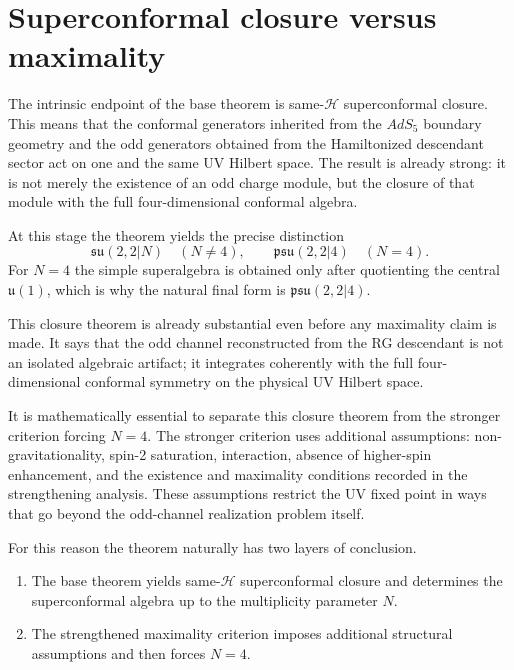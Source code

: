 \documentclass[
  aps,
  prd,
  onecolumn,
  notitlepage,
  nofootinbib,
  superscriptaddress,
  10pt
]{revtex4-2}
\theoremstyle{definition}
\theoremstyle{plain}
\begin{document}
\section{Superconformal closure versus maximality}
\label{sec:UV-fixed-point}

The intrinsic endpoint of the base theorem is same-\(\mathcal H\)
superconformal closure.  This means that the conformal generators inherited
from the \(AdS_5\) boundary geometry and the odd generators obtained from the
Hamiltonized descendant sector act on one and the same UV Hilbert space.  The
result is already strong: it is not merely the existence of an odd charge
module, but the closure of that module with the full four-dimensional
conformal algebra.

At this stage the theorem yields the precise distinction
\[
\mathfrak{su}(2,2|N)\quad (N\neq4),
\qquad
\mathfrak{psu}(2,2|4)\quad (N=4).
\]
For \(N=4\) the simple superalgebra is obtained only after quotienting the
central \(\mathfrak u(1)\), which is why the natural final form is
\(\mathfrak{psu}(2,2|4)\).

This closure theorem is already substantial even before any maximality claim
is made.  It says that the odd channel reconstructed from the RG descendant is
not an isolated algebraic artifact; it integrates coherently with the full
four-dimensional conformal symmetry on the physical UV Hilbert space.

It is mathematically essential to separate this closure theorem from the
stronger criterion forcing \(N=4\).  The stronger criterion uses additional
assumptions: non-gravitationality, spin-2 saturation, interaction, absence of
higher-spin enhancement, and the existence and maximality conditions recorded
in the strengthening analysis.  These assumptions restrict the UV fixed point in ways that go beyond the
odd-channel realization problem itself.

For this reason the theorem naturally has two layers of conclusion.
\begin{enumerate}[label=\textnormal{(\roman*)},leftmargin=*,itemsep=0.35em]
  \item The base theorem yields same-\(\mathcal H\) superconformal closure and
  determines the superconformal algebra up to the multiplicity parameter
  \(N\).
  \item The strengthened maximality criterion imposes additional structural
  assumptions and then forces \(N=4\).
\end{enumerate}
\end{document}
